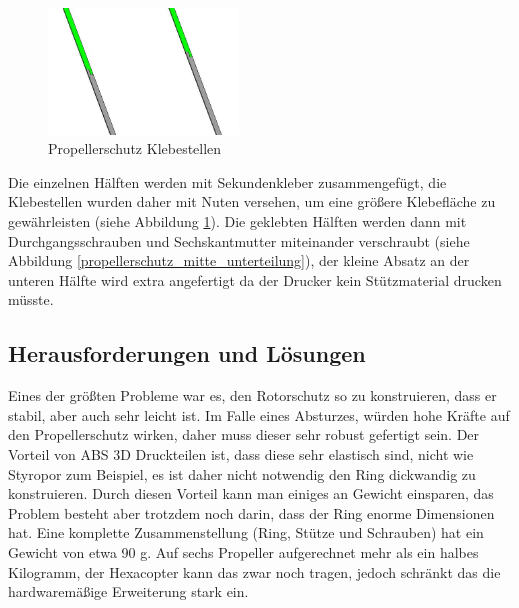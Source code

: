 			\begin{figure}[H]
			\begin{centering}
			\includegraphics[width = 0.45\textwidth]{Bilder/propellerschutz_klebestellen}
			\par\end{centering}
			\caption{Propellerschutz Klebestellen}
			\label{propellerschutz_klebestellen}
			\end{figure}

	Die einzelnen Hälften  werden mit Sekundenkleber zusammengefügt, die Klebestellen wurden daher mit Nuten versehen,
	um eine größere Klebefläche zu gewährleisten (siehe Abbildung \ref{propellerschutz_klebestellen}).
	Die geklebten Hälften werden dann mit Durchgangsschrauben und Sechskantmutter miteinander verschraubt (siehe Abbildung  \ref{propellerschutz_mitte_unterteilung}),
	der kleine Absatz an der unteren Hälfte wird extra angefertigt da der Drucker kein Stützmaterial drucken müsste.


	\subsection{Herausforderungen und Lösungen}

	Eines der größten Probleme war es, den Rotorschutz so zu konstruieren, dass er stabil, aber auch sehr leicht ist.
	Im Falle eines Absturzes, würden hohe Kräfte auf den Propellerschutz wirken, daher muss dieser sehr robust gefertigt sein.
	Der Vorteil von ABS \bzw 3D Druckteilen ist, dass diese sehr elastisch sind, nicht wie Styropor zum Beispiel, es ist daher nicht notwendig den Ring dickwandig zu konstruieren.
 	Durch diesen Vorteil kann man einiges an Gewicht einsparen, das Problem besteht aber trotzdem noch darin, dass der Ring enorme Dimensionen hat.
	Eine komplette Zusammenstellung (Ring, Stütze und Schrauben) hat ein Gewicht von etwa 90 g.
	Auf sechs Propeller aufgerechnet mehr als ein halbes Kilogramm, der Hexacopter kann das zwar noch tragen, jedoch schränkt das die hardwaremäßige Erweiterung stark ein.

